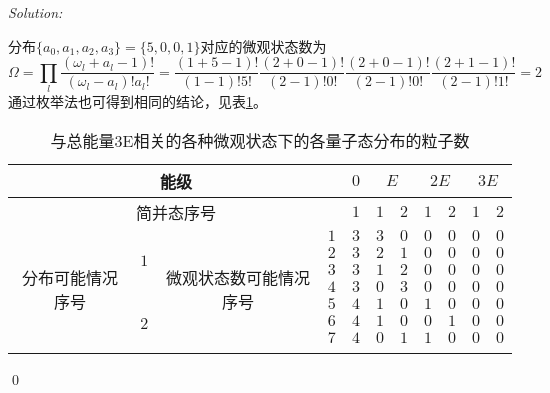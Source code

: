 \documentclass[12pt,a4paper]{article}
\newenvironment{sol}
    {\emph{Solution:}
    }
    {
    \qed
    }
\begin{document}
\begin{sol}
\begin{itemize}
\begin{equation}
\end{equation}
分布$\{a_0,a_1,a_2,a_3\}=\{5,0,0,1\}$对应的微观状态数为
\begin{equation}
\Omega=\prod_l\frac{(\omega_l+a_l-1)!}{(\omega_l-a_l)!a_l!}=\frac{(1+5-1)!}{(1-1)!5!}\frac{(2+0-1)!}{(2-1)!0!}\frac{(2+0-1)!}{(2-1)!0!}\frac{(2+1-1)!}{(2-1)!1!}=2
\end{equation}
通过枚举法也可得到相同的结论，见表\ref{3E2}。
\begin{table}[h]
\centering
\caption{与总能量3E相关的各种微观状态下的各量子态分布的粒子数}
\label{3E2}
\begin{tabular}{|c|c|c|c|c|c|c|c|c|c|c|}
\hline
\multicolumn{4}{|c|}{能级}                                                                 & $0$ & \multicolumn{2}{c|}{$E$} & \multicolumn{2}{c|}{$2E$} & \multicolumn{2}{c|}{$3E$} \\ \hline
\multicolumn{4}{|c|}{简并态序号}                                                              & $1$ & $1$         & $2$        & $1$         & $2$         & $1$         & $2$         \\ \hline
\multirow{10}{*}{分布可能情况序号} & \multirow{4}{*}{$1$} & \multirow{10}{*}{微观状态数可能情况序号} & $1$  & $3$ & $3$         & $0$        & $0$         & $0$         & $0$         & $0$         \\ \cline{4-11} 
                           &                      &                               & $2$  & $3$ & $2$         & $1$        & $0$         & $0$         & $0$         & $0$         \\ \cline{4-11} 
                           &                      &                               & $3$  & $3$ & $1$         & $2$        & $0$         & $0$         & $0$         & $0$         \\ \cline{4-11} 
                           &                      &                               & $4$  & $3$ & $0$         & $3$        & $0$         & $0$         & $0$         & $0$         \\ \cline{2-2} \cline{4-11} 
                           & \multirow{4}{*}{$2$} &                               & $5$  & $4$ & $1$         & $0$        & $1$         & $0$         & $0$         & $0$         \\ \cline{4-11} 
                           &                      &                               & $6$  & $4$ & $1$         & $0$        & $0$         & $1$         & $0$         & $0$         \\ \cline{4-11} 
                           &                      &                               & $7$  & $4$ & $0$         & $1$        & $1$         & $0$         & $0$         & $0$         \\ \cline{4-11} 

\end{tabular}
\end{table}
\end{itemize}
\end{sol}
\end{document}
